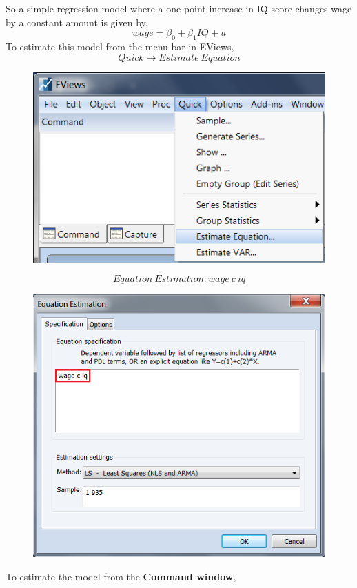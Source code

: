 \documentclass[12pt]{report}
\begin{document}
\noindent So a simple regression model where a one-point increase in IQ score changes wage by a constant amount is given by,
$$wage=\beta_0+\beta_1IQ+u$$
\noindent To estimate this model from the menu bar in EViews,
$$Quick \to Estimate\ Equation$$
\begin{figure}[H]
	\centering
	\includegraphics{q3_11}
\end{figure}
\vspace{-\baselineskip}
$$Equation\ Estimation: wage\ c\ iq$$
\begin{figure}[H]
	\centering
	\includegraphics{q3_12}
\end{figure}
\vspace{-\baselineskip}
\noindent To estimate the model from the \textbf{Command window},
\end{document}
